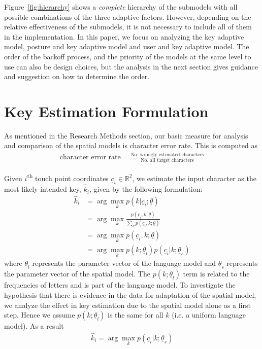 \documentclass{sigchi}
\begin{document}
Figure~\ref{fig:hierarchy} shows a \textit{complete} hierarchy of the submodels with all
possible combinations of the three adaptive factors. However, depending on the
relative effectiveness of the submodels, it is not necessary to include all of
them in the implementation. In this paper, we focus on analyzing the key
adaptive model, posture and key adaptive model and user and key adaptive model.
The order of the
backoff process, and the priority of the models at the same level to use can
also be design choices, but the analysis in the next section gives
guidance and suggestion on how to determine the order.

\section{Key Estimation Formulation} 
As mentioned in the Research Methods section, our basic measure for analysis and comparison of the spatial models is character error rate. This is computed as
\begin{align}
\text{character error rate} = \frac{\text{No. wrongly estimated characters}}{\text{No. all target characters}}
\end{align}

Given $i$\textsuperscript{th} touch point coordinates $\underline c_i \in \mathbb{R}^2$, we estimate the input character as the most likely intended key, $\hat k_i$,  given by the following formulation:
\begin{align}
\hat k_i &= \arg\max_k p(k | \underline c_i; \underline \theta) \\
          &= \arg\max_k \frac{p(\underline c_i, k; \underline \theta)}{\sum_k p(\underline c_i, k; \underline \theta)} \\
          &= \arg\max_k p(\underline c_i, k; \underline \theta) \\
          &= \arg\max_k p(k;\underline\theta_l)p(\underline c_i | k; \underline \theta_s) \label{eq:likely-k}
\end{align}
where $\underline\theta_l$ represents the parameter vector of the language model and $\underline\theta_s$ represents the parameter vector of the spatial model. The $p(k;\underline\theta_l)$ term is related to the frequencies of letters and is part of the language model. To investigate the hypothesis that there is evidence in the data for adaptation of the spatial model, we analyze the effect in key estimation due to the spatial model alone as a first step. Hence we assume $p(k; \underline\theta_l)$ is the same for all $k$ (i.e. a uniform language model). As a result
\begin{align}
\hat k_i = \arg\max_k p(\underline c_i | k; \underline \theta_s)
\end{align}
\end{document}
